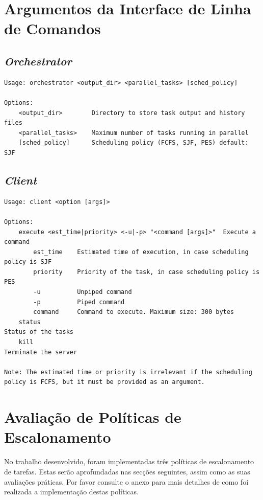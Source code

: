 \documentclass[a4paper,11pt]{scrreprt}
\begin{document}
\begin{minipage}{\textwidth}
\chapter{Argumentos da Interface de Linha de Comandos}
    \section{\textit{Orchestrator}}
\begin{lstlisting}
Usage: orchestrator <output_dir> <parallel_tasks> [sched_policy]

Options:
    <output_dir>        Directory to store task output and history files
    <parallel_tasks>    Maximum number of tasks running in parallel
    [sched_policy]      Scheduling policy (FCFS, SJF, PES) default: SJF
\end{lstlisting}
    \section{\textit{Client}}
\begin{lstlisting}
Usage: client <option [args]>

Options:
    execute <est_time|priority> <-u|-p> "<command [args]>"  Execute a command
        est_time    Estimated time of execution, in case scheduling policy is SJF
        priority    Priority of the task, in case scheduling policy is PES
        -u          Unpiped command
        -p          Piped command
        command     Command to execute. Maximum size: 300 bytes
    status                                                           Status of the tasks
    kill                                                             Terminate the server

Note: The estimated time or priority is irrelevant if the scheduling policy is FCFS, but it must be provided as an argument.
\end{lstlisting}
\end{minipage}

\chapter{Avaliação de Políticas de Escalonamento}
    No trabalho desenvolvido, foram implementadas três políticas de escalonamento de tarefas.
    Estas serão aprofundadas nas secções seguintes, assim como as suas avaliações práticas.
    Por favor consulte o anexo  para mais detalhes de como foi realizada
    a implementação destas políticas.
\end{document}
